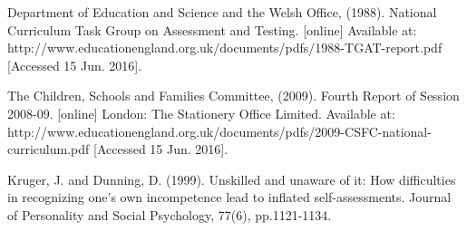 \begin{thebibliography}{9}

    Department of Education and Science and the Welsh Office,
    (1988).
    National Curriculum Task Group on Assessment and Testing.
    [online]
    Available at: http://www.educationengland.org.uk/documents/pdfs/1988-TGAT-report.pdf
    [Accessed 15 Jun. 2016].

    The Children, Schools and Families Committee,
    (2009).
    Fourth Report of Session 2008-09.
    [online]
    London: The Stationery Office Limited.
    Available at: http://www.educationengland.org.uk/documents/pdfs/2009-CSFC-national-curriculum.pdf
    [Accessed 15 Jun. 2016].

    Kruger, J. and Dunning, D.
    (1999).
    Unskilled and unaware of it: How difficulties in recognizing one's own incompetence lead to inflated self-assessments.
    Journal of Personality and Social Psychology, 77(6), pp.1121-1134.

\end{thebibliography}
